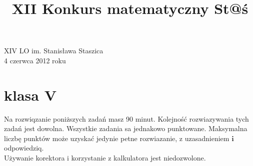 \documentclass[10pt]{article}
\title{XII Konkurs matematyczny St@ś }
\author{}
\date{}
\begin{document}
\maketitle
XIV LO im. Stanisława Staszica\\
4 czerwca 2012 roku

\section*{klasa V}
Na rozwiqzanie poniższych zadań masz 90 minut. Kolejność rozwiazywania tych zadań jest dowolna. Wszystkie zadania sa jednakowo punktowane. Maksymalna liczbę punktów może uzyskać jedynie petne rozwiazanie, z uzasadnieniem \(\boldsymbol{i}\) odpowiedziq.\\
Używanie korektora i korzystanie z kalkulatora jest niedozwolone.
\end{document}
